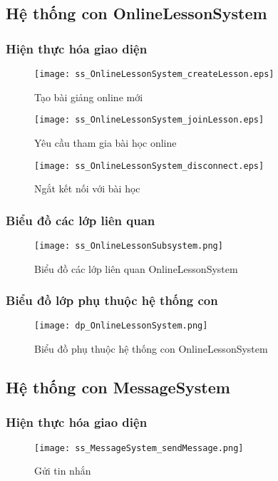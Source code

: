 \documentclass[./../main.tex]{subfiles}
\begin{document}
\subsection{Hệ thống con OnlineLessonSystem}
\subsubsection{Hiện thực hóa giao diện}
\begin{figure}[H]
    \centering
    \texttt{[image: ss\_OnlineLessonSystem\_createLesson.eps]}
    \caption{Tạo bài giảng online mới}
    \label{ss_ols_cl}
\end{figure}

\begin{figure}[H]
    \centering
    \texttt{[image: ss\_OnlineLessonSystem\_joinLesson.eps]}
    \caption{Yêu cầu tham gia bài học online}
    \label{ss_ols_rjl}
\end{figure}

\begin{figure}[H]
    \centering
    \texttt{[image: ss\_OnlineLessonSystem\_disconnect.eps]}
    \caption{Ngắt kết nối với bài học}
    \label{ss_ols_d}
\end{figure}
\subsubsection{Biểu đồ các lớp liên quan}
\begin{figure}[H]
    \centering
    \texttt{[image: ss\_OnlineLessonSubsystem.png]}
    \caption{Biểu đồ các lớp liên quan OnlineLessonSystem}
\label{ss_ols}
\end{figure}
\subsubsection{Biểu đồ lớp phụ thuộc hệ thống con}
\begin{figure}[H]
    \centering
    \texttt{[image: dp\_OnlineLessonSystem.png]}
    \caption{Biểu đồ phụ thuộc hệ thống con OnlineLessonSystem}
    \label{dp_ols}
\end{figure}

\subsection{Hệ thống con MessageSystem}
\subsubsection{Hiện thực hóa giao diện}
\begin{figure}[H]
    \centering
    \texttt{[image: ss\_MessageSystem\_sendMessage.png]}
    \caption{Gửi tin nhắn}
    \label{ss_ms_sm}
\end{figure}
\end{document}
